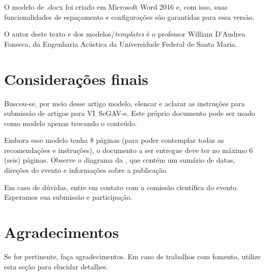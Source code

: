 O modelo de .docx foi criado em Microsoft Word 2016 e, com isso, suas funcionalidades de espaçamento e configurações são garantidas para essa versão.

O autor deste texto e dos modelos/\textit{templates} é o professor William D'Andrea Fonseca, da Engenharia Acústica da Universidade Federal de Santa Maria. 

\section{Considerações finais}

Buscou-se, por meio desse artigo modelo, elencar e aclarar as instruções para submissão de artigos para VI~SeGAV-e. Este próprio documento pode ser usado como modelo apenas trocando o conteúdo.

Embora esse modelo tenha 8 páginas (para poder contemplar todas as recomendações e instruções), o documento a ser entregue deve ter no máximo 6 (seis) páginas.
%
Observe o diagrama da , que contém um sumário de datas, direções do evento e informações sobre a publicação.

Em caso de dúvidas, entre em contato com a comissão científica do evento. Esperamos sua submissão e participação.


\section{Agradecimentos}

Se for pertinente, faça agradecimentos.
%
Em caso de trabalhos com fomento, utilize esta seção para elucidar detalhes.

